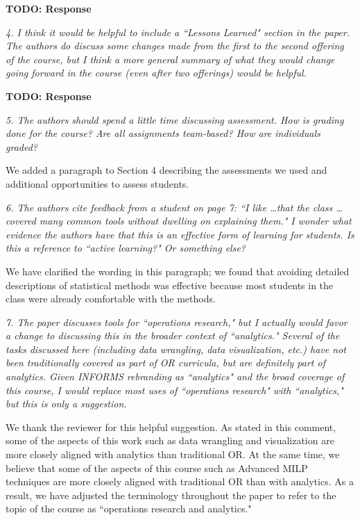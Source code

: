 \documentclass[12pt, letterpaper]{article}
\begin{document}
\textbf{TODO: Response}

\vspace{0.5cm}

\noindent\textit{4. I think it would be helpful to include a ``Lessons Learned" section in the paper. The authors do discuss some changes made from the first to the second offering of the course, but I think a more general summary of what they would change going forward in the course (even after two offerings) would be helpful.}

\textbf{TODO: Response}

\vspace{0.5cm}

\noindent\textit{5. The authors should spend a little time discussing assessment. How is grading done for the course? Are all assignments team-based? How are individuals graded?}

We added a paragraph to Section 4 describing the assessments we used and additional opportunities to assess students.

\vspace{0.5cm}

\noindent\textit{6. The authors cite feedback from a student on page 7: ``I like \ldots that the class \ldots covered many common tools without dwelling on explaining them." I wonder what evidence the authors have that this is an effective form of learning for students. Is this a reference to ``active learning?" Or something else?}

We have clarified the wording in this paragraph; we found that avoiding detailed descriptions of statistical methods was effective because most students in the class were already comfortable with the methods.

\vspace{0.5cm}

\noindent\textit{7. The paper discusses tools for ``operations research," but I actually would favor a change to discussing this in the broader context of ``analytics." Several of the tasks discussed here (including data wrangling, data visualization, etc.) have not been traditionally covered as part of OR curricula, but are definitely part of analytics. Given INFORMS rebranding as ``analytics" and
the broad coverage of this course, I would replace most uses of ``operations research" with
``analytics," but this is only a suggestion.}

We thank the reviewer for this helpful suggestion. As stated in this comment, some of the aspects of this work such as data wrangling and visualization are more closely aligned with analytics than traditional OR. At the same time, we believe that some of the aspects of this course such as Advanced MILP techniques are more closely aligned with traditional OR than with analytics. As a result, we have adjusted the terminology throughout the paper to refer to the topic of the course as ``operations research and analytics."
\end{document}
